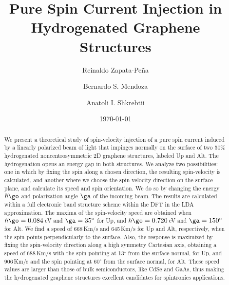 \documentclass[floatfix,prb,aps,superscriptaddress,showpacs,11pt,preprint,letterpaper]{revtex4}
\begin{document}
\title{Pure Spin Current Injection in Hydrogenated Graphene Structures}
\author{Reinaldo Zapata-Pe\~na}
\author{Bernardo S. Mendoza}
\author{Anatoli I. Shkrebtii}

\date{\today}

\begin{abstract}
We present a theoretical study of spin-velocity injection of a pure
spin current induced by  a linearly
polarized beam of light that impinges normally on the surface of  two 50\%
hydrogenated noncentrosymmetric 2D graphene 
structures, labeled Up and Alt.
The hydrogenation opens an energy gap in both structures.
We analyze two possibilities: one in which by fixing the spin along a
chosen direction, the resulting spin-velocity is calculated, 
and another where we choose the spin-velocity direction
on the surface plane, and calculate its speed and
spin orientation. We do so by changing the energy $\hbar\go$ 
and polarization angle $\ga$  of the incoming  beam. 
The results are calculated within a full
electronic band structure scheme within the DFT in the LDA approximation.
The maxima of the spin-velocity speed are obtained when
$\hbar\go=0.084$\,eV and $\ga=35^\circ$ for Up,
and
$\hbar\go=0.720$\,eV and $\ga=150^\circ$ for Alt.
We find a speed of
668\,Km/s
and 
645\,Km/s
for Up and Alt, respectively, when the spin points perpendicularly to
the surface. Also,
the response is maximized
by fixing the spin-velocity direction along a high symmetry Cartesian axis,
obtaining a speed of 
688\,Km/s 
with the spin  pointing at 13$^\circ$ from the surface normal, for Up,
and
906\,Km/s 
and the spin pointing at 60$^\circ$ from the surface normal, for Alt.
These speed values are larger than those of bulk semiconductors, like
CdSe and GaAs, thus 
making the hydrogenated graphene structures
 excellent candidates for spintronics
applications.
\end{abstract}

\maketitle

\end{document}
